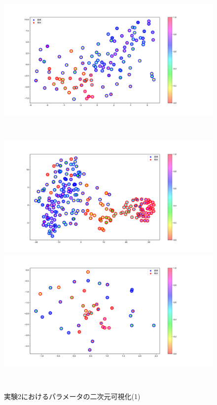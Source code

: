 \begin{figure}[h]
\begin{minipage}[b]{0.48\linewidth}
 \end{minipage}
 \begin{minipage}[b]{0.48\linewidth}
  \centering
  \includegraphics[scale=0.15]{./imgs/tSNE/sofa_4.pdf}
 \end{minipage}\\
 \begin{minipage}[b]{0.48\linewidth}
  \centering
  \includegraphics[scale=0.15]{./imgs/tSNE/sofa_5.pdf}
 \end{minipage}
 \begin{minipage}[b]{0.48\linewidth}
  \centering
  \includegraphics[scale=0.15]{./imgs/tSNE/sofa_6.pdf}
 \end{minipage}\\
 \caption{実験2におけるパラメータの二次元可視化(1)}\label{fig:tSNE2_1}
\end{figure}

